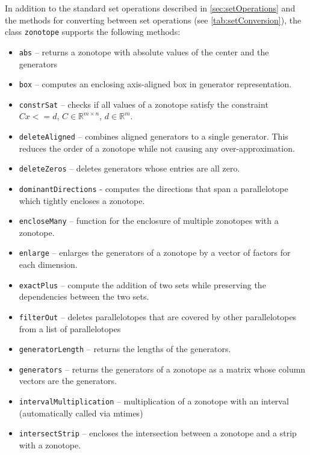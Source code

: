 In addition to the standard set operations described in \cref{sec:setOperations} and the methods for converting between set operations (see \cref{tab:setConversion}), the class \texttt{zonotope} supports the following methods:
\begin{itemize}
    \item \texttt{abs} -- returns a zonotope with absolute values of the center and the generators
    \item \texttt{box} -- computes an enclosing axis-aligned box in generator representation.
    \item \texttt{constrSat} -- checks if all values of a zonotope satisfy the constraint $Cx<=d$, $C\in\mathbb{R}^{m\times n}$, $d\in\mathbb{R}^m$.
    \item \texttt{deleteAligned} -- combines aligned generators to a single generator. This reduces the order of a zonotope while not causing any over-approximation.
    \item \texttt{deleteZeros} -- deletes generators whose entries are all zero.
    \item \texttt{dominantDirections} - computes the directions that span a parallelotope which tightly encloses a zonotope.
    \item \texttt{encloseMany} -- function for the enclosure of multiple zonotopes with a zonotope.
    \item \texttt{enlarge} -- enlarges the generators of a zonotope by a vector of factors for each dimension.
    \item \texttt{exactPlus} -- compute the addition of two sets while preserving the dependencies between the two sets.
    \item \texttt{filterOut} -- deletes parallelotopes that are covered by other parallelotopes from a list of parallelotopes
    \item \texttt{generatorLength} -- returns the lengths of the generators.
    \item \texttt{generators} -- returns the generators of a zonotope as a matrix whose column vectors are the generators.
    \item \texttt{intervalMultiplication} -- multiplication of a zonotope with an interval (automatically called via mtimes)
    \item \texttt{intersectStrip} -- encloses the intersection between a zonotope and a strip with a zonotope.

\end{itemize}
